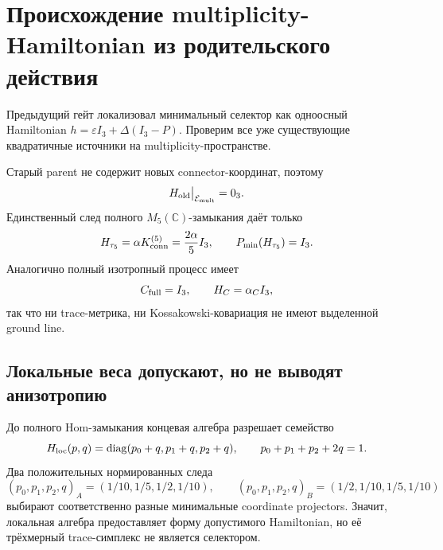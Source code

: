 \chapter{Происхождение multiplicity-Hamiltonian из родительского действия}
\label{ch:v8-baryon-c0-multiplicity-environment-hamiltonian-parent-origin-gate}

Предыдущий гейт локализовал минимальный селектор как одноосный Hamiltonian
$h=\varepsilon I_3+\Delta(I_3-P)$. Проверим все уже существующие
квадратичные источники на multiplicity-пространстве.

Старый parent не содержит новых connector-координат, поэтому
\begin{equation}
 H_{\rm old}\big|_{\mathcal E_{\rm mult}}=0_3.
 \label{eq:v8-baryon-c0-parent-origin-old-zero-hamiltonian}
\end{equation}
Единственный след полного $M_5(\mathbb C)$-замыкания даёт только
\begin{equation}
 H_{\tau_5}=\alpha K_{\rm conn}^{(5)}
 =\frac{2\alpha}{5}I_3,
 \qquad P_{\min}(H_{\tau_5})=I_3.
 \label{eq:v8-baryon-c0-parent-origin-m5-scalar-hamiltonian}
\end{equation}
Аналогично полный изотропный процесс имеет
\begin{equation}
 C_{\rm full}=I_3,
 \qquad H_C=\alpha_C I_3,
 \label{eq:v8-baryon-c0-parent-origin-kossakowski-scalar}
\end{equation}
так что ни trace-метрика, ни Kossakowski-ковариация не имеют выделенной
ground line.

\section{Локальные веса допускают, но не выводят анизотропию}

До полного Hom-замыкания концевая алгебра разрешает семейство
\begin{equation}
 H_{\rm loc}(p,q)
 =\operatorname{diag}(p_0+q,p_1+q,p_2+q),
 \qquad p_0+p_1+p_2+2q=1.
 \label{eq:v8-baryon-c0-parent-origin-local-trace-hamiltonian}
\end{equation}
Два положительных нормированных следа
\begin{equation}
 (p_0,p_1,p_2,q)_A=(1/10,1/5,1/2,1/10),
 \qquad
 (p_0,p_1,p_2,q)_B=(1/2,1/10,1/5,1/10)
 \label{eq:v8-baryon-c0-parent-origin-local-trace-witnesses}
\end{equation}
выбирают соответственно разные минимальные coordinate projectors. Значит,
локальная алгебра предоставляет форму допустимого Hamiltonian, но её
трёхмерный trace-симплекс не является селектором.

